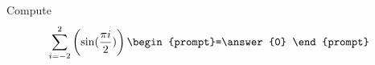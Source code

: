 \documentclass{ximera}
\author{Gregory Hartman \and Matthew Carr}
\begin{document}
\begin{exercise}

Compute
\[
\sum_{i=-2}^{2}\left(\sin(\frac{\pi i}{2})\right)\begin{prompt}=\answer{0}
\end{prompt}
\]

\end{exercise}
\end{document}
